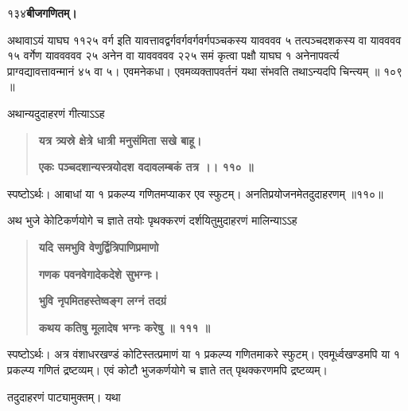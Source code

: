 \documentclass[11pt, openany]{book}
\begin{document}
\onehalfspacing
१३४\hspace{2in}\textbf{बीजगणितम्।} 

\vspace{5mm}

\begin{sloppypar}
\hangindent=0.2in अथावाऽयं याघघ ११२५ वर्ग इति यावत्तावद्वर्गवर्गवर्गवर्गपञ्चकस्य यावववव ५ तत्पञ्चदशकस्य वा यावववव १५ वर्गेण याववववव २५ अनेन वा याववववव २२५ समं कृत्वा पक्षौ याघघ १ अनेनापवर्त्य प्राग्वद्यावत्तावन्मानं ४५ वा ५। एवमनेकधा। एवमव्यक्तापवर्तनं यथा संभवति तथाऽन्यदपि चिन्त्यम् ॥ १०९ ॥

\hangindent=0.2in \hspace{0.2in}अथान्यदुदाहरणं गीत्याऽऽह\textendash

\begin{quote}
\hspace{0.5in}\textbf{यत्र त्र्यस्रे क्षेत्रे धात्री मनुसंमिता सखे बाहू।}

\hspace{0.5in}\textbf{एकः पञ्चदशान्यस्त्रयोदश वदावलम्बकं तत्र ।। ११० ॥}
\end{quote}

\hangindent=0.2in \hspace{0.2in}स्पष्टोऽर्थः। आबाधां या १ प्रकल्प्य गणितमप्याकर एव स्फुटम्। अनतिप्रयोजनमेतदुदाहरणम् ॥११०॥

\hangindent=0.2in \hspace{0.2in}अथ भुजे केोटिकर्णयोगे च ज्ञाते तयोः पृथक्करणं दर्शयितुमुदाहरणं मालिन्याऽऽह\textendash

\begin{quote}
\hspace{1in}\textbf{यदि समभुवि वेणुर्द्वित्रिपाणिप्रमाणो}

\hspace{1in}\textbf{गणक पवनवेगादेकदेशे सुभग्नः।}

\hspace{1in}\textbf{भुवि नृपमितहस्तेष्वङ्ग लग्नं तदग्रं}

\hspace{1in}\textbf{कथय कतिषु मूलादेष भग्नः करेषु ॥ १११ ॥}
\end{quote}

\hangindent=0.2in \hspace{0.2in}स्पष्टोऽर्थः। अत्र वंशाधरखण्डं कोटिस्तत्प्रमाणं या १ प्रकल्प्य गणितमाकरे स्फुटम्। एवमूर्ध्वखण्डमपि या १ प्रकल्प्य गणितं द्रष्टव्यम्। एवं कोटौ भुजकर्णयोगे च ज्ञाते तत् पृथक्करणमपि द्रष्टव्यम्।

\hangindent=0.2in \hspace{0.2in}तदुदाहरणं पाट्यामुक्तम्। यथा\textendash


\end{sloppypar}
\end{document}
